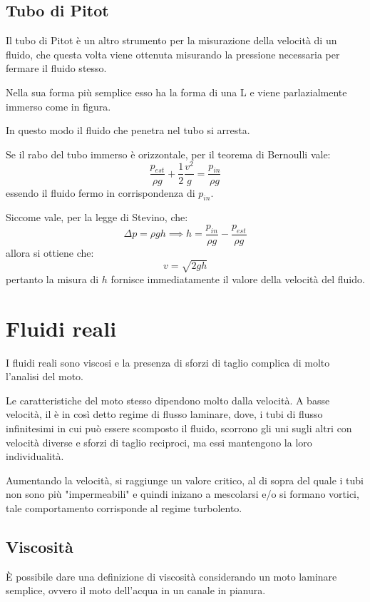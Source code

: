 \documentclass[11pt, a4paper, openright]{book}
\theoremstyle{plain}
\theoremstyle{definition}
\begin{document}

\subsection{Tubo di Pitot}
Il tubo di Pitot è un altro strumento per la misurazione della velocità di un fluido, che questa volta viene ottenuta misurando la pressione necessaria per fermare il fluido stesso.

Nella sua forma più semplice esso ha la forma di una L e viene parlazialmente immerso come in figura.

In questo modo il fluido che penetra nel tubo si arresta.

Se il rabo del tubo immerso è orizzontale, per il teorema di Bernoulli vale:
\begin{equation}
    \frac{p_{est}}{\rho g} + \frac{1}{2}\frac{v^2}{g} = \frac{p_{in}}{\rho g}
\end{equation} 
essendo il fluido fermo in corrispondenza di $p_{in}$.

Siccome vale, per la legge di Stevino, che:
\begin{equation}
    \Delta p = \rho g h \implies h = \frac{p_{in}}{\rho g} - \frac{p_{est}}{\rho g}
\end{equation}
allora si ottiene che:
\begin{equation}
    v = \sqrt{2gh}
\end{equation}
pertanto la misura di $h$ fornisce immediatamente il valore della velocità del fluido.

\section{Fluidi reali}
I fluidi reali sono viscosi e la presenza di sforzi di taglio complica di molto l'analisi del moto. 

Le caratteristiche del moto stesso dipendono molto dalla velocità.
A basse velocità, il è in così detto regime di flusso laminare, dove, i tubi di flusso infinitesimi in cui può essere scomposto il fluido, scorrono gli uni sugli altri con velocità diverse e sforzi di taglio reciproci, ma essi mantengono la loro individualità.

Aumentando la velocità, si raggiunge un valore critico, al di sopra del quale i tubi non sono più "impermeabili" e quindi inizano a mescolarsi e/o si formano vortici, tale comportamento corrisponde al regime turbolento.

\subsection{Viscosità}
È possibile dare una definizione di viscosità considerando un moto laminare semplice, ovvero il moto dell'acqua in un canale in pianura.
\end{document}
